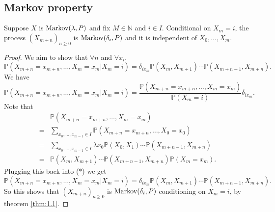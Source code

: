 \documentclass[a4paper]{article}
\begin{document}
\subsection{Markov property}
\begin{theorem}\label{thm:simple_markov_property}
    Suppose $ X $ is $ \operatorname{Markov}(\lambda,P) $ and fix $ M\in \mathbb{N}  $ and $ i\in I $. Conditional on $X_m=i$, the process $ (X_{m+n})_{n\ge 0} $ is $ \operatorname{Markov}(\delta_i, P) $ and it is independent of $ X_0,\dots,X_m $.
\end{theorem}
\begin{proof}
    We aim to show that $ \forall n $ and $ \forall x_i $, 
    \[
        \mathbb{P}(X_{m+n}=x_{m+n},\dots,X_m=x_m|X_m=i)= \delta_{ix_m}\mathbb{P}(X_m,X_{m+1})\cdots \mathbb{P}(X_{m+n-1},X_{m+n}).
    \]
    We have 
    \[
        \mathbb{P}(X_{m+n}=x_{m+n},\dots,X_m=x_m|X_m=i)= \frac{\mathbb{P}(X_{m+n}=x_{m+n},\dots,X_{m}=x_m)}{\mathbb{P}(X_m=i)}\delta_{ix_m}. \tag{$ * $}
    \]
    Note that
    \begin{align*}
        &\mathbb{P}(X_{m+n}=x_{m+n},\dots,X_m=x_m)\\
        =& \sum_{x_0,\dots,x_{m-1}\in I}\mathbb{P}(X_{m+n}=x_{m+n},\dots,X_0=x_0)\tag{Result in IA Probability}\\ 
        =& \sum_{x_0,\dots,x_{m-1}\in I} \lambda x_0 \mathbb{P}(X_0,X_1)\cdots  \mathbb{P}(X_{m+n-1},X_{m+n}) \tag{Since $ X \sim \Markov(\lambda,P) $}\\ 
        =& \mathbb{P}(X_m,X_{m+1})\cdots \mathbb{P}(X_{m+n-1},X_{m+n})\mathbb{P}(X_m=x_m).
    \end{align*}
    Plugging this back into ($ * $) we get 
    \[
        \mathbb{P}(X_{m+n}=x_{m+n},\dots,X_m=x_m|X_m=i)= \delta_{ix_m}\mathbb{P}(X_m,X_{m+1})\cdots \mathbb{P}(X_{m+n-1},X_{m+n}).
    \]
    So this shows that $ (X_{m+n})_{n\ge 0} $ is $ \operatorname{Markov}(\delta_i,P) $ conditioning on $X_m=i$, by theorem \ref{thm:1.1}.


\end{proof}
\end{document}
